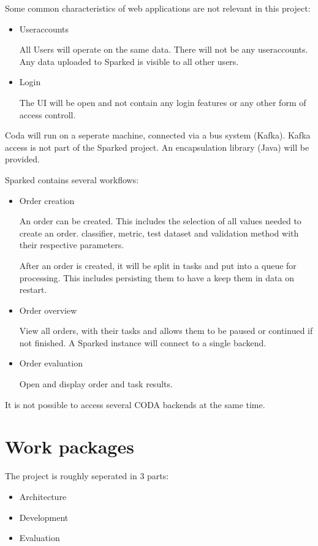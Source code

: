\documentclass[12pt,a4paper,titlepage,oneside,BCOR1cm]{scrreprt}
\begin{document}
Some common characteristics of web applications are not relevant in this project:
\begin{itemize}
  \item Useraccounts

  All Users will operate on the same data. There will not be any useraccounts. Any data uploaded to Sparked is visible to all other users.
  \item Login

  The UI will be open and not contain any login features or any other form of access controll.
\end{itemize}

Coda will run on a seperate machine, connected via a bus system (Kafka). Kafka access is not part of the Sparked project. An encapsulation library (Java) will be provided.

Sparked contains several workflows:
\begin{itemize}
  \item Order creation

  An order can be created. This includes the selection of all values needed to create an order. classifier, metric, test dataset and validation method with their respective parameters.

  After an order is created, it will be split in tasks and put into a queue for processing. This includes persisting them to have a keep them in data on restart.

  \item Order overview

  View all orders, with their tasks and allows them to be paused or continued if not finished. A Sparked instance will connect to a single backend. 

  \item Order evaluation
  
  Open and display order and task results.
\end{itemize}

It is not possible to access several CODA backends at the same time. 


\chapter{Work packages}

The project is roughly seperated in 3 parts:
\begin{itemize}
  \item Architecture
  \item Development
  \item Evaluation
\end{itemize}
\end{document}

